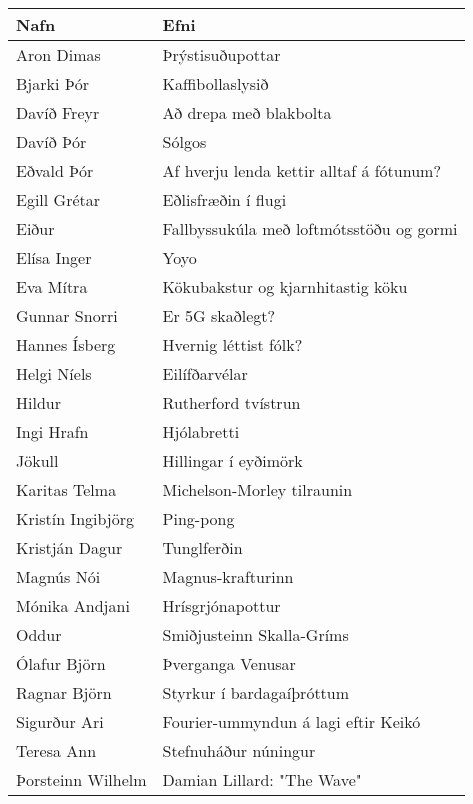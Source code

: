\begin{table}[H]
    \centering
    \begin{tabular}{|l|l|}
    \hline  \textbf{Nafn} & \textbf{Efni} \\ \hline \hline
       Aron Dimas & Þrýstisuðupottar \\ \hline
       Bjarki Þór & Kaffibollaslysið  \\ \hline
        Davíð Freyr & Að drepa með blakbolta   \\ \hline
        Davíð Þór & Sólgos  \\ \hline
       Eðvald Þór & Af hverju lenda kettir alltaf á fótunum?  \\ \hline
       Egill Grétar & Eðlisfræðin í flugi \\ \hline
        Eiður & Fallbyssukúla með loftmótsstöðu og gormi \\ \hline
       Elísa Inger & Yoyo \\ \hline
        Eva Mítra & Kökubakstur og kjarnhitastig köku \\ \hline
       Gunnar Snorri & Er 5G skaðlegt? \\ \hline
       Hannes Ísberg & Hvernig léttist fólk?   \\ \hline
       Helgi Níels & Eilífðarvélar \\ \hline
      Hildur & Rutherford tvístrun   \\ \hline
       Ingi Hrafn & Hjólabretti  \\ \hline
       Jökull & Hillingar í eyðimörk  \\ \hline
       Karitas Telma & Michelson-Morley tilraunin   \\ \hline
       Kristín Ingibjörg & Ping-pong  \\ \hline
      Kristján Dagur & Tunglferðin   \\ \hline
       Magnús Nói & Magnus-krafturinn \\ \hline
       Mónika Andjani & Hrísgrjónapottur \\ \hline
       Oddur & Smiðjusteinn Skalla-Gríms \\ \hline
       Ólafur Björn & Þverganga Venusar \\ \hline
       Ragnar Björn & Styrkur í bardagaíþróttum  \\ \hline
       Sigurður Ari & Fourier-ummyndun á lagi eftir Keikó  \\ \hline
       Teresa Ann & Stefnuháður núningur  \\ \hline
       Þorsteinn Wilhelm & Damian Lillard: "The Wave"  \\ \hline
    \end{tabular}
\end{table}

